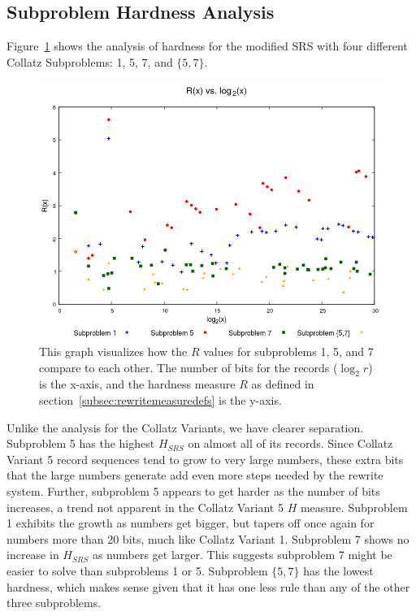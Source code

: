 \subsection{Subproblem Hardness Analysis} \label{subsec:rewritehardness}
Figure~\ref{fig:rvslog} shows the analysis of hardness for the modified SRS with four different Collatz Subproblems: 1, 5, 7, and $\{5,7\}$. 
\begin{figure}
    \centering
    \includegraphics[scale=0.75]{ModAvoidanceAnalysisPics/R_vs_log.png}
    \caption{This graph visualizes how the $R$ values for subproblems 1, 5, and 7 compare to each other. The number of bits for the records ($\log_2{r}$) is the x-axis, and the hardness measure $R$ as defined in section~\ref{subsec:rewritemeasuredefs} is the y-axis.}
    \label{fig:rvslog}
\end{figure}
Unlike the analysis for the Collatz Variants, we have clearer separation. Subproblem 5 has the highest $H_{SRS}$ on almost all of its records. Since Collatz Variant 5 record sequences tend to grow to very large numbers, these extra bits that the large numbers generate add even more steps needed by the rewrite system. Further, subproblem 5 appears to get harder as the number of bits increases, a trend not apparent in the Collatz Variant 5 $H$ measure. Subproblem 1 exhibits the growth as numbers get bigger, but tapers off once again for numbers more than 20 bits, much like Collatz Variant 1. Subproblem 7 shows no increase in $H_{SRS}$ as numbers get larger. This suggests subproblem 7 might be easier to solve than subproblems 1 or 5. Subproblem $\{5,7\}$ has the lowest hardness, which makes sense given that it has one less rule than any of the other three subproblems.
